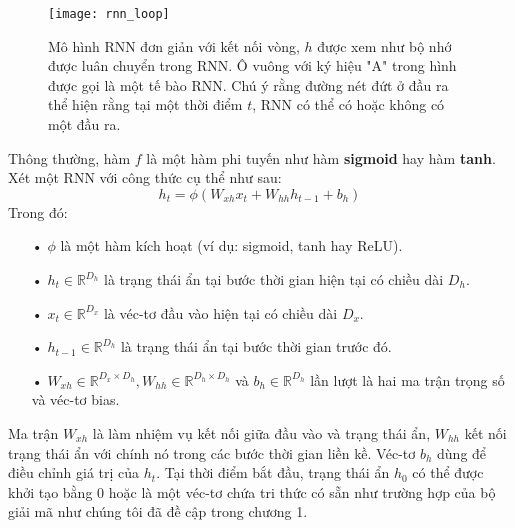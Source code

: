 \begin{figure}
	\centering
	\texttt{[image: rnn\_loop]}
	\caption[Mô hình RNN với kết nối vòng]{Mô hình RNN đơn giản với kết nối vòng, \textbf{$h$} được xem như bộ nhớ được luân chuyển trong RNN. Ô vuông với ký hiệu "A" trong hình được gọi là một tế bào RNN. Chú ý rằng đường nét đứt ở đầu ra thể hiện rằng tại một thời điểm $t$, RNN có thể có hoặc không có một đầu ra.}
	\label{fig_rnn_loop}
\end{figure}
Thông thường, hàm $f$ là một hàm phi tuyến như hàm \textbf{sigmoid} hay hàm \textbf{tanh}. Xét một RNN với công thức cụ thể như sau:
\begin{equation} \label{rnnWithTanh}
	h_t = \phi \left(W_{xh} x_t + W_{hh}h_{t-1} + b_h \right)
\end{equation}
Trong đó:
\begin{itemize}
	\item[•] $\phi$ là một hàm kích hoạt (ví dụ: sigmoid, tanh hay ReLU).
	\item[•] $h_{t} \in \mathbb{R}^{D_h}$ là trạng thái ẩn tại bước thời gian hiện tại có chiều dài $D_h$.
	\item[•] $x_t \in \mathbb{R}^{D_x}$ là véc-tơ đầu vào hiện tại có chiều dài $D_x$.
	\item[•] $h_{t-1} \in \mathbb{R}^{D_h}$ là trạng thái ẩn tại bước thời gian trước đó.
	\item[•] $W_{xh} \in \mathbb{R}^{D_x \times D_h}, W_{hh} \in \mathbb{R}^{D_h \times D_h}$ và $b_h \in \mathbb{R}^{D_h}$ lần lượt là hai ma trận trọng số và véc-tơ bias.
\end{itemize}

Ma trận $W_{xh}$ là làm nhiệm vụ kết nối giữa đầu vào và trạng thái ẩn, $W_{hh}$ kết nối trạng thái ẩn với chính nó trong các bước thời gian liền kề. Véc-tơ $b_h$ dùng để điều chỉnh giá trị của $h_t$. Tại thời điểm bắt đầu, trạng thái ẩn $h_0$ có thể được khởi tạo bằng 0 hoặc là một véc-tơ chứa tri thức có sẵn như trường hợp của bộ giải mã như chúng tôi đã đề cập trong chương 1.

